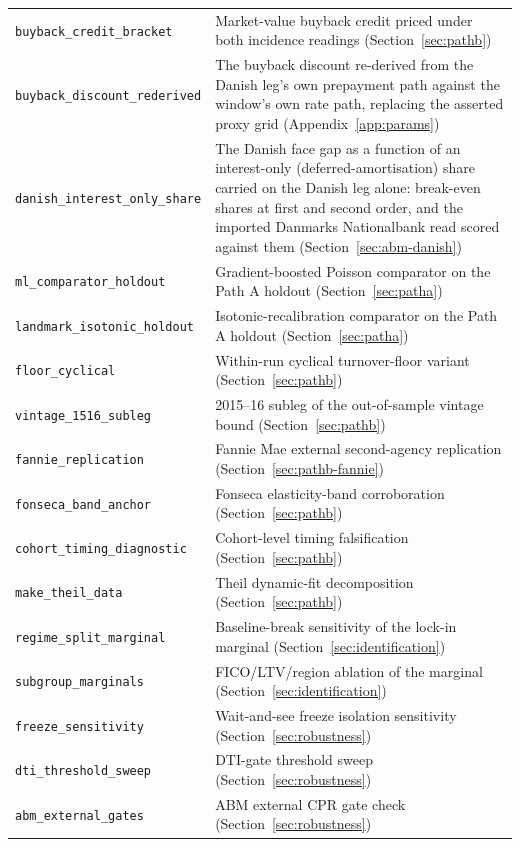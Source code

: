 \documentclass[12pt]{article}
\begin{document}
{\begin{longtable}{@{}p{5.4cm}p{8.8cm}@{}}
\texttt{buyback\_credit\_bracket} & Market-value buyback credit priced under both incidence readings (Section~\ref{sec:pathb}) \\
\texttt{buyback\_discount\_rederived} & The buyback discount re-derived from the Danish leg's own prepayment path against the window's own rate path, replacing the asserted proxy grid (Appendix~\ref{app:params}) \\
\texttt{danish\_interest\_only\_share} & The Danish face gap as a function of an interest-only (deferred-amortisation) share carried on the Danish leg alone: break-even shares at first and second order, and the imported Danmarks Nationalbank read scored against them (Section~\ref{sec:abm-danish}) \\
\texttt{ml\_comparator\_holdout} & Gradient-boosted Poisson comparator on the Path A holdout (Section~\ref{sec:patha}) \\
\texttt{landmark\_isotonic\_holdout} & Isotonic-recalibration comparator on the Path A holdout (Section~\ref{sec:patha}) \\
\texttt{floor\_cyclical} & Within-run cyclical turnover-floor variant (Section~\ref{sec:pathb}) \\
\texttt{vintage\_1516\_subleg} & 2015--16 subleg of the out-of-sample vintage bound (Section~\ref{sec:pathb}) \\
\texttt{fannie\_replication} & Fannie Mae external second-agency replication (Section~\ref{sec:pathb-fannie}) \\
\texttt{fonseca\_band\_anchor} & Fonseca elasticity-band corroboration (Section~\ref{sec:pathb}) \\
\texttt{cohort\_timing\_diagnostic} & Cohort-level timing falsification (Section~\ref{sec:pathb}) \\
\texttt{make\_theil\_data} & Theil dynamic-fit decomposition (Section~\ref{sec:pathb}) \\
\texttt{regime\_split\_marginal} & Baseline-break sensitivity of the lock-in marginal (Section~\ref{sec:identification}) \\
\texttt{subgroup\_marginals} & FICO/LTV/region ablation of the marginal (Section~\ref{sec:identification}) \\
\texttt{freeze\_sensitivity} & Wait-and-see freeze isolation sensitivity (Section~\ref{sec:robustness}) \\
\texttt{dti\_threshold\_sweep} & DTI-gate threshold sweep (Section~\ref{sec:robustness}) \\
\texttt{abm\_external\_gates} & ABM external CPR gate check (Section~\ref{sec:robustness}) \\

\end{longtable}}
\end{document}
